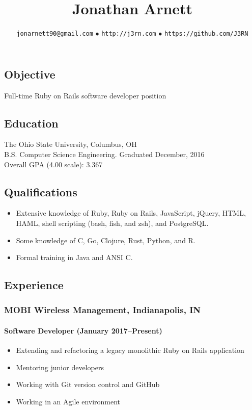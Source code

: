 \documentclass[]{article}
\begin{document}
\title{Jonathan Arnett}
\author{\texttt{jonarnett90@gmail.com} $\bullet$ \texttt{http://j3rn.com} $\bullet$ \texttt{https://github.com/J3RN}}
\date{}
\maketitle

\subsection*{Objective}
Full-time Ruby on Rails software developer position

\subsection*{Education}
The Ohio State University, Columbus, OH \\
B.S. Computer Science Engineering. Graduated December, 2016 \\
Overall GPA (4.00 scale): 3.367

\subsection*{Qualifications}
\begin{itemize}
\item Extensive knowledge of Ruby, Ruby on Rails, JavaScript, jQuery, HTML, HAML, shell scripting (bash, fish, and zsh), and PostgreSQL.
\item Some knowledge of C, Go, Clojure, Rust, Python, and R.
\item Formal training in Java and ANSI C.
\end{itemize}

\subsection*{Experience}

\subsubsection*{MOBI Wireless Management, Indianapolis, IN}
\paragraph*{Software Developer (January 2017--Present)}
\begin{itemize}
\item Extending and refactoring a legacy monolithic Ruby on Rails application
\item Mentoring junior developers
\item Working with Git version control and GitHub
\item Working in an Agile environment
\end{itemize}
\end{document}
